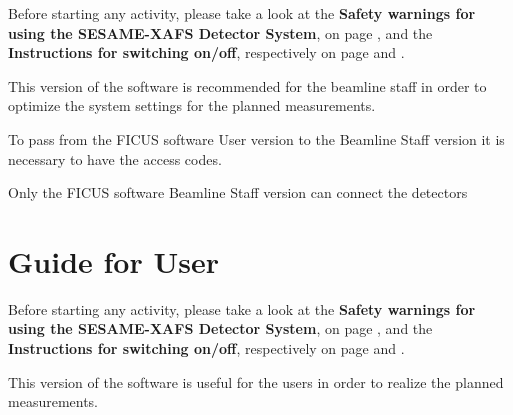 \documentclass[a4paper,12pt,oneside,pdflatex,italian,final,twocolumn]{article}
\begin{document}
Before starting any activity, please take a look at the \textbf{Safety warnings for using the SESAME-XAFS Detector System}, on page \pageref{accensione}, and the \textbf{Instructions for switching on/off}, respectively on page \pageref{accensione} and \pageref{spegnimento}.

This version of the software is recommended for the beamline staff in order to optimize the system settings for the planned measurements.

To pass from the FICUS software User version to the Beamline Staff version it is necessary to have the access codes.

Only the FICUS software Beamline Staff version can connect the detectors

















































\clearpage

\section{Guide for User}

Before starting any activity, please take a look at the \textbf{Safety warnings for using the SESAME-XAFS Detector System}, on page \pageref{accensione}, and the \textbf{Instructions for switching on/off}, respectively on page \pageref{accensione} and \pageref{spegnimento}.

This version of the software is useful for the users in order to realize the planned measurements.
\end{document}
